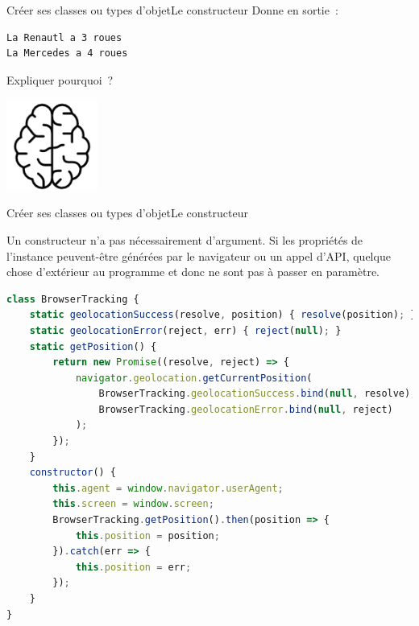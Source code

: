 \documentclass{beamer}
\begin{document}
    \begin{frame}[fragile]{Créer ses classes ou types d'objet}{Le constructeur}
        Donne en sortie~:
        \begin{lstlisting}[language=Bash,title={\tiny{Commande dans un Shell/Console/PowerShell}}]
La Renautl a 3 roues
La Mercedes a 4 roues
        \end{lstlisting}
        Expliquer pourquoi~?
        \bigbreak
        \begin{center}
            \includegraphics[width=3cm]{image/intelligence}
        \end{center}
    \end{frame}


    \begin{frame}[fragile]{Créer ses classes ou types d'objet}{Le constructeur}
        \begin{footnotesize}
            Un constructeur n'a pas nécessairement d'argument.
            Si les propriétés de l'instance peuvent-être générées par le navigateur ou un appel d'API, quelque chose d'extérieur au programme et donc ne sont pas à passer en paramètre.
        \end{footnotesize}
        \begin{lstlisting}[language=JavaScript,title={\tiny{Script JavaScript}},basicstyle=\tiny\ttfamily]
class BrowserTracking {
    static geolocationSuccess(resolve, position) { resolve(position); }
    static geolocationError(reject, err) { reject(null); }
    static getPosition() {
        return new Promise((resolve, reject) => {
            navigator.geolocation.getCurrentPosition(
                BrowserTracking.geolocationSuccess.bind(null, resolve),
                BrowserTracking.geolocationError.bind(null, reject)
            );
        });
    }
    constructor() {
        this.agent = window.navigator.userAgent;
        this.screen = window.screen;
        BrowserTracking.getPosition().then(position => {
            this.position = position;
        }).catch(err => {
            this.position = err;
        });
    }
}
        \end{lstlisting}
    \end{frame}
\end{document}
